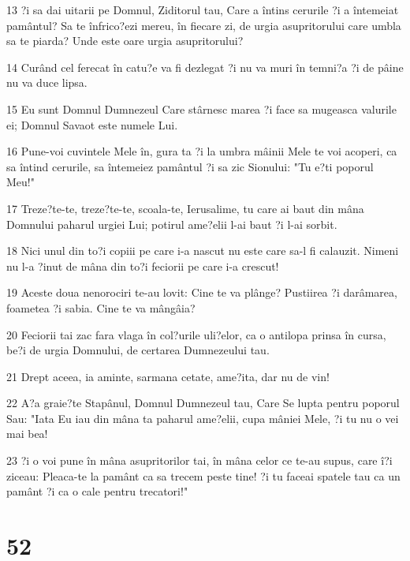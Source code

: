 \par 13 ?i sa dai uitarii pe Domnul, Ziditorul tau, Care a întins cerurile ?i a întemeiat pamântul? Sa te înfrico?ezi mereu, în fiecare zi, de urgia asupritorului care umbla sa te piarda? Unde este oare urgia asupritorului?
\par 14 Curând cel ferecat în catu?e va fi dezlegat ?i nu va muri în temni?a ?i de pâine nu va duce lipsa.
\par 15 Eu sunt Domnul Dumnezeul Care stârnesc marea ?i face sa mugeasca valurile ei; Domnul Savaot este numele Lui.
\par 16 Pune-voi cuvintele Mele în, gura ta ?i la umbra mâinii Mele te voi acoperi, ca sa întind cerurile, sa întemeiez pamântul ?i sa zic Sionului: "Tu e?ti poporul Meu!"
\par 17 Treze?te-te, treze?te-te, scoala-te, Ierusalime, tu care ai baut din mâna Domnului paharul urgiei Lui; potirul ame?elii l-ai baut ?i l-ai sorbit.
\par 18 Nici unul din to?i copiii pe care i-a nascut nu este care sa-l fi calauzit. Nimeni nu l-a ?inut de mâna din to?i feciorii pe care i-a crescut!
\par 19 Aceste doua nenorociri te-au lovit: Cine te va plânge? Pustiirea ?i darâmarea, foametea ?i sabia. Cine te va mângâia?
\par 20 Feciorii tai zac fara vlaga în col?urile uli?elor, ca o antilopa prinsa în cursa, be?i de urgia Domnului, de certarea Dumnezeului tau.
\par 21 Drept aceea, ia aminte, sarmana cetate, ame?ita, dar nu de vin!
\par 22 A?a graie?te Stapânul, Domnul Dumnezeul tau, Care Se lupta pentru poporul Sau: "Iata Eu iau din mâna ta paharul ame?elii, cupa mâniei Mele, ?i tu nu o vei mai bea!
\par 23 ?i o voi pune în mâna asupritorilor tai, în mâna celor ce te-au supus, care î?i ziceau: Pleaca-te la pamânt ca sa trecem peste tine! ?i tu faceai spatele tau ca un pamânt ?i ca o cale pentru trecatori!"

\chapter{52}

